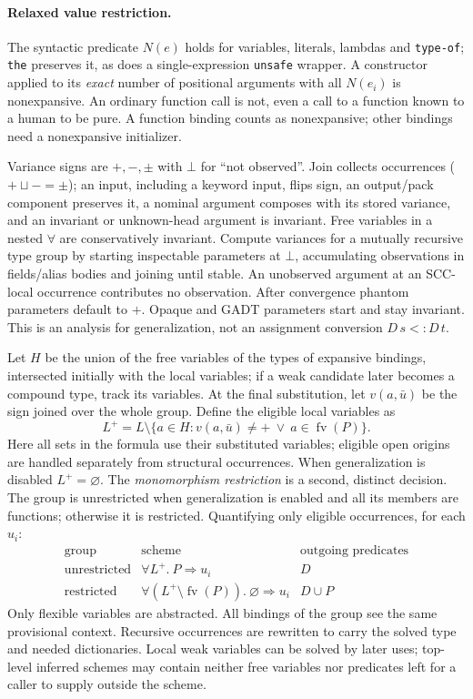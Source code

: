 \documentclass[11pt]{article}
\theoremstyle{definition}
\newcommand{\code}[1]{\texttt{#1}}
\newcommand{\fv}{\operatorname{fv}}
\begin{document}
\paragraph{Relaxed value restriction.}
The syntactic predicate $N(e)$ holds for variables, literals, lambdas and
\code{type-of}; \code{the} preserves it, as does a single-expression
\code{unsafe} wrapper. A constructor applied to its \emph{exact} number
of positional arguments with all $N(e_i)$ is nonexpansive. An ordinary
function call is not, even a call to a function known to a human to be pure.
A function binding counts as nonexpansive; other bindings need a
nonexpansive initializer.

Variance signs are $+,-,\pm$ with $\bot$ for ``not observed''. Join
collects occurrences ($+\sqcup-=\pm$); an input, including a keyword
input, flips sign, an output/pack component preserves it, a nominal
argument composes with its stored variance, and an invariant or
unknown-head argument is invariant. Free variables in a nested $\forall$
are conservatively invariant. Compute variances for a mutually recursive
type group by starting inspectable parameters at $\bot$, accumulating
observations in fields/alias bodies and joining until stable. An
unobserved argument at an SCC-local occurrence contributes no observation.
After convergence phantom parameters default to $+$. Opaque and GADT
parameters start and stay invariant. This is an analysis for generalization,
not an assignment conversion $D\,s<:D\,t$.

Let $H$ be the union of the free variables of the types of expansive
bindings, intersected initially with the local variables; if a weak
candidate later becomes a compound type, track its variables. At the
final substitution, let $v(a,\bar u)$ be the sign joined over the
whole group. Define the eligible local variables as
\[
 L^+ = L\setminus
   \{a\in H : v(a,\bar u)\ne +\ \lor\ a\in\fv(P)\}.
\]
Here all sets in the formula use their substituted variables; eligible open
origins are handled separately from structural occurrences. When
generalization is disabled $L^+=\varnothing$. The \emph{monomorphism
restriction} is a second, distinct decision. The group is unrestricted
when generalization is enabled and all its members are functions; otherwise
it is restricted. Quantifying only eligible occurrences, for each $u_i$:
\[
\begin{array}{c|c|c}
 \text{group} & \text{scheme} & \text{outgoing predicates}\\ \hline
 \text{unrestricted} & \forall L^+.\ P\Rightarrow u_i & D\\
 \text{restricted}
    & \forall(L^+\setminus\fv(P)).\ \varnothing\Rightarrow u_i & D\cup P
\end{array}
\]
Only flexible variables are abstracted. All bindings of the group see the
same provisional context. Recursive occurrences are rewritten to carry the
solved type and needed dictionaries. Local weak variables can be solved by
later uses; top-level inferred schemes may contain neither free variables
nor predicates left for a caller to supply outside the scheme.
\end{document}
